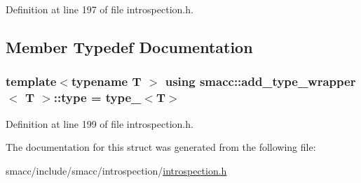 Definition at line 197 of file introspection.\+h.



\subsection{Member Typedef Documentation}
\subsubsection[{\texorpdfstring{type}{type}}]{\setlength{\rightskip}{0pt plus 5cm}template$<$typename T $>$ using {\bf smacc\+::add\+\_\+type\+\_\+wrapper}$<$ T $>$\+::{\bf type} =  {\bf type\+\_\+}$<$T$>$}\hypertarget{structsmacc_1_1add__type__wrapper_a3e5af90e35b5a70d9c4d952ef8011da9}{}\label{structsmacc_1_1add__type__wrapper_a3e5af90e35b5a70d9c4d952ef8011da9}


Definition at line 199 of file introspection.\+h.



The documentation for this struct was generated from the following file\+:\begin{DoxyCompactItemize}
\item 
smacc/include/smacc/introspection/\hyperlink{introspection_8h}{introspection.\+h}\end{DoxyCompactItemize}
